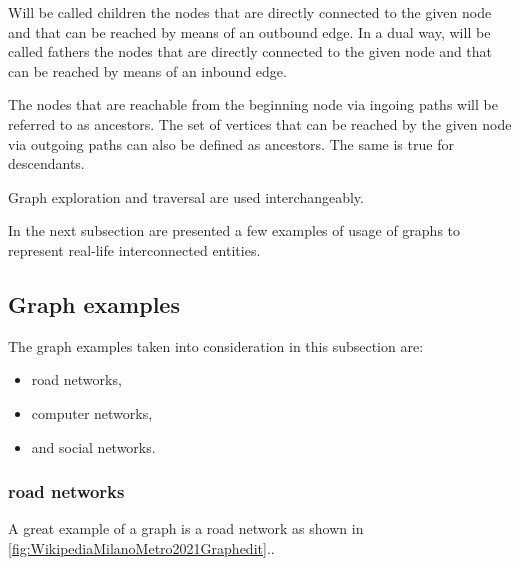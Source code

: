 \begin{remark}\label{remark:onfathersandchildren}
	Will be called children the nodes that are directly connected to the given node and that can be reached by means of an outbound edge.
	In a dual way, will be called fathers the nodes that are directly connected to the given node and that can be reached by means of an inbound edge.
\end{remark}
	
\begin{remark}\label{remark:onancestorsanddescendants}
	The nodes that are reachable from the beginning node via ingoing paths will be referred to as ancestors.
	The set of vertices that can be reached by the given node via outgoing paths can also be defined as ancestors.
	The same is true for descendants.
\end{remark}
	
\begin{remark}\label{remark:onexplorationandtraversals}
	Graph exploration and traversal are used interchangeably.
\end{remark}

In the next subsection are presented a few examples of usage of graphs to represent real-life interconnected entities.

\subsection{Graph examples} \label{subsection:LiteratureReview/ShortreviewofGraphTheoryconcepts/Graphexamples}
The graph examples taken into consideration in this subsection are:
 \begin{itemize}[noitemsep]
	\item \gls{road network}s,
	\item \gls{computer network}s,
	\item and \gls{social network}s.
\end{itemize}



\subsubsection[Road networks]{\Glspl{road network}} \label{subsubsection:LiteratureReview/ShortreviewofGraphTheoryconcepts/Graphexamples/Roadnetworks}
A great example of a graph is a road network as shown in \hyperref[fig:WikipediaMilanoMetro2021Graphedit]{\autoref{fig:WikipediaMilanoMetro2021Graphedit}}..

